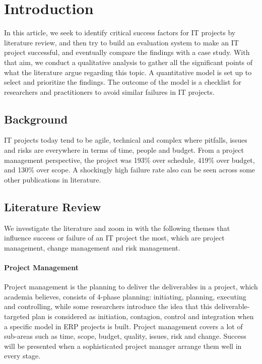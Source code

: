
\section{Introduction}

In this article, we seek to identify critical success factors for IT projects by literature review, and then try to build an evaluation system to make an IT project successful, and eventually compare the findings with a case study. With that aim, we conduct a qualitative analysis to gather all the significant points of what the literature argue regarding this topic. A quantitative model is set up to select and prioritize the findings. The outcome of the model is a checklist for researchers and practitioners to avoid similar failures in IT projects.

\subsection{Background}
IT projects today tend to be agile, technical and complex\parencite[p. 2]{4} where pitfalls, issues and risks are everywhere in terms of time, people and budget. From a
project management perspective, the project was 193\% over schedule, 419\% over budget, and 130\% over scope\parencite[p. 8]{6}. A shockingly high failure rate also can be seen across some other publications in literature\parencite{2,3}.

\subsection{Literature Review}
We investigate the literature and zoom in with the following themes that influence success or failure of an IT project the most, which are project management, change management and risk management.

\paragraph{Project Management}
Project management is the planning to deliver the deliverables in a project, which academia believes, consists of 4-phase planning: initiating, planning, executing and controlling, while some researchers introduce the idea that this deliverable-targeted plan is considered as initiation, contagion, control and integration when a specific model in ERP projects is built\parencite[p. 3]{2}. Project management covers a lot of sub-areas such as time, scope, budget, quality, issues, risk and change. Success will be presented when a sophisticated project manager arrange them well in every stage.

